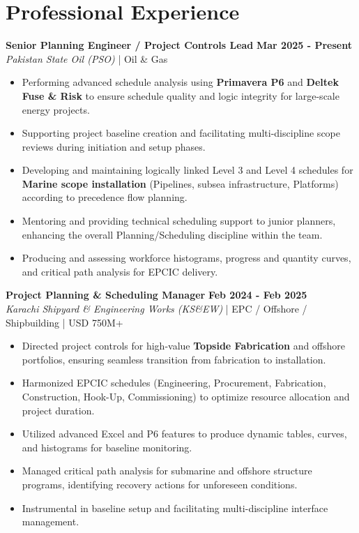 \documentclass[11pt,a4paper]{article}
\begin{document}
\section{Professional Experience}
\noindent \textbf{\large Senior Planning Engineer / Project Controls Lead} \hfill \textbf{\color{awesome-blue}Mar 2025 - Present}\\
\textit{Pakistan State Oil (PSO)} | Oil \& Gas\\
\begin{itemize}
    \item Performing advanced schedule analysis using \textbf{Primavera P6} and \textbf{Deltek Fuse \& Risk} to ensure schedule quality and logic integrity for large-scale energy projects.
    \item Supporting project baseline creation and facilitating multi-discipline scope reviews during initiation and setup phases.
    \item Developing and maintaining logically linked Level 3 and Level 4 schedules for \textbf{Marine scope installation} (Pipelines, subsea infrastructure, Platforms) according to precedence flow planning.
    \item Mentoring and providing technical scheduling support to junior planners, enhancing the overall Planning/Scheduling discipline within the team.
    \item Producing and assessing workforce histograms, progress and quantity curves, and critical path analysis for EPCIC delivery.
\end{itemize}

\noindent \textbf{\large Project Planning \& Scheduling Manager} \hfill \textbf{\color{awesome-blue}Feb 2024 - Feb 2025}\\
\textit{Karachi Shipyard \& Engineering Works (KS\&EW)} | EPC / Offshore / Shipbuilding | USD 750M+\\
\begin{itemize}
    \item Directed project controls for high-value \textbf{Topside Fabrication} and offshore portfolios, ensuring seamless transition from fabrication to installation.
    \item Harmonized EPCIC schedules (Engineering, Procurement, Fabrication, Construction, Hook-Up, Commissioning) to optimize resource allocation and project duration.
    \item Utilized advanced Excel and P6 features to produce dynamic tables, curves, and histograms for baseline monitoring.
    \item Managed critical path analysis for submarine and offshore structure programs, identifying recovery actions for unforeseen conditions.
    \item Instrumental in baseline setup and facilitating multi-discipline interface management.
\end{itemize}
\end{document}
